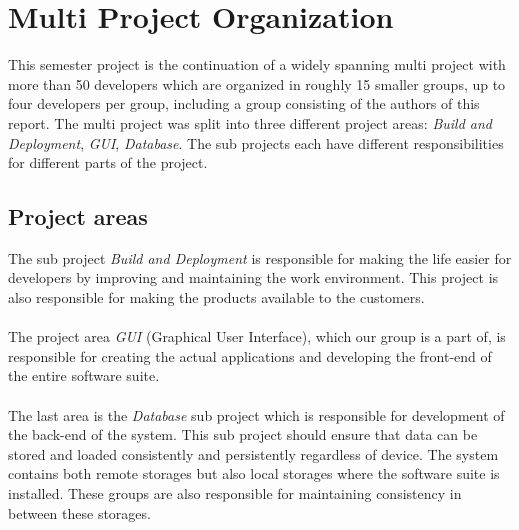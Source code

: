 
\section{Multi Project Organization}
\label{sec:multi_project_organization}

This semester project is the continuation of a widely spanning multi project with more than 50 developers which are organized in roughly 15 smaller groups, up to four developers per group, including a group consisting of the authors of this report. The multi project was split into three different project areas: \emph{Build and Deployment}, \emph{GUI}, \emph{Database}. The sub projects each have different responsibilities for different parts of the project.

\subsection{Project areas}
The sub project \emph{Build and Deployment} is responsible for making the life easier for developers by improving and maintaining the work environment. This project is also responsible for making the products available to the customers.
\\\\
The project area \emph{GUI} (Graphical User Interface), which our group is a part of, is responsible for creating the actual applications and developing the front-end of the entire \giraf software suite.
\\\\
The last area is the \emph{Database} sub project which is responsible for development of the back-end of the system. This sub project should ensure that data can be stored and loaded consistently and persistently regardless of device. The \giraf system contains both remote storages but also local storages where the software suite is installed. These groups are also responsible for maintaining consistency in between these storages.


